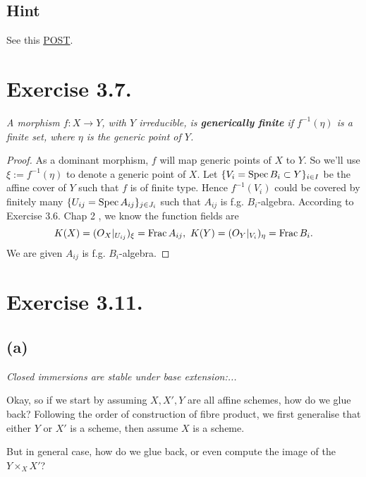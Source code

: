 \subsection{Hint}

See this \href{https://math.stackexchange.com/questions/218767/relation-of-function-field-of-a-scheme-to-the-local-ring-of-its-prime-divisor}{POST}.

\section{Exercise 3.7.}

\textit{A morphism $f:X\to Y$, with $Y$ irreducible, is \textbf{generically finite } if $f^{-1}(\eta)$ is a finite set, where $\eta$ is the generic point of $Y$.}

\begin{proof}
    
    As a dominant morphism, $f$ will map generic points of $X$ to $Y$. So we'll use $\xi:=f^{-1}(\eta)$ to denote a generic point of $X$. Let $\{V_i=\operatorname{Spec} B_i\subset Y\}_{i\in I}$ be the affine cover of  $Y$ such that $f$ is of finite type. Hence $f^{-1}(V_i)$ could be covered by finitely many $\{U_{ij}=\operatorname{Spec} A_{ij}\}_{j\in J_i}$ such that $A_{ij}$ is f.g. $B_i$-algebra. According to Exercise 3.6. Chap 2 \cite{hartshorne2013algebraic}, we know the function fields are 
    \[K(X)=\mathcal (O_X\vert_{U_{ij}})_{\xi}=\operatorname{Frac} A_{ij},~ K(Y)=\mathcal (O_Y\vert_{V_i})_{\eta}=\operatorname{Frac} B_i.\]
    We are given $A_{ij}$ is f.g. $B_i$-algebra. 

\end{proof}

\section{Exercise 3.11.}

\subsection{(a)}
\textit{Closed immersions are stable under base extension:...}

Okay, so if we start by assuming $X,X',Y$ are all affine schemes, how do we glue back? Following the order of construction of fibre product, we first generalise that either $Y$ or $X'$ is a scheme, then assume $X$ is a scheme. 

But in general case, how do we glue back, or even compute the image of the $Y\times_{X}X'$?

